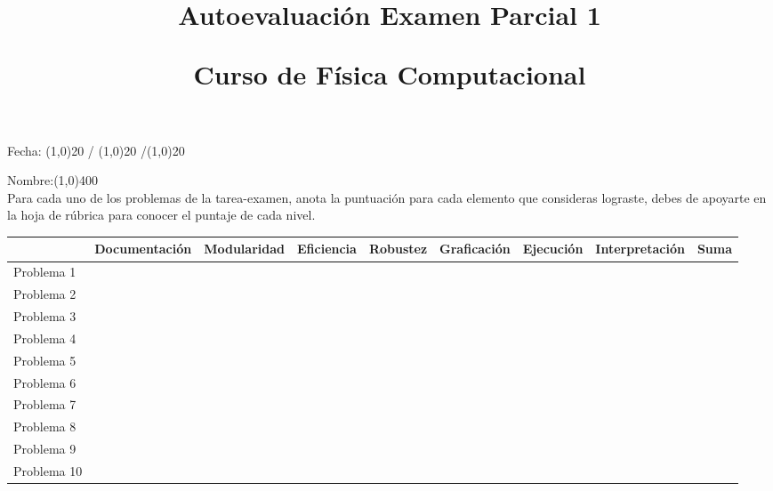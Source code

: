 \documentclass[landscape]{article}
\title{Autoevaluación Examen Parcial 1 \\ \begin{large}Curso de Física Computacional\end{large}}
\date{ }
\begin{document}
\maketitle
\fontsize{12}{12}\selectfont
{}
\begin{flushright}
Fecha: \line(1,0){20} / \line(1,0){20} /\line(1,0){20}
\end{flushright}
Nombre:\line(1,0){400}
\\
Para cada uno de los problemas de la tarea-examen, anota la puntuación para cada elemento que consideras lograste, debes de apoyarte en la hoja de rúbrica para conocer el puntaje de cada nivel.
\fontsize{14}{14}\selectfont
\begin{center}
\renewcommand{\arraystretch}{2.3}
\begin{tabular}{| l | c | c | c | c | c | c | c | c |}
\hline
 & Documentación & Modularidad & Eficiencia & Robustez & Graficación & Ejecución & Interpretación & Suma \\ \hline
Problema 1 & & & & & & & & \\ \hline
Problema 2 & & & & & & & & \\ \hline
Problema 3 & & & & & & & & \\ \hline
Problema 4 & & & & & & & & \\ \hline
Problema 5 & & & & & & & & \\ \hline
Problema 6 & & & & & & & & \\ \hline
Problema 7 & & & & & & & & \\ \hline
Problema 8 & & & & & & & & \\ \hline
Problema 9 & & & & & & & & \\ \hline
Problema 10 & & & & & & & & \\ \hline
\end{tabular}
\end{center}
\end{document}
